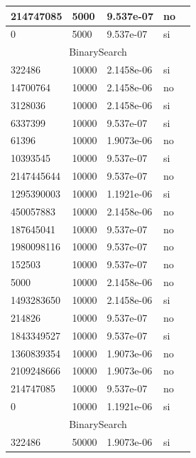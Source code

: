 \documentclass[12pt, fleqn]{article}                             %
\theoremstyle{break}                                            %
\begin{document}
\begin{longtable}{|m{5em}|m{5em}|m{10em}|m{5em}|@{}m{0pt}@{}}
            214747085& 5000  & 9.537e-07 & no &\\[1em]    \hline
            0& 5000  & 9.537e-07 & si &\\[1em]    \hline
            \multicolumn{5}{|c|}{BinarySearch}   \\          \hline
            322486& 10000  & 2.1458e-06 & si &\\[1em]    \hline
            14700764& 10000  & 2.1458e-06 & no &\\[1em]    \hline
            3128036& 10000  & 2.1458e-06 & si &\\[1em]    \hline
            6337399& 10000  & 9.537e-07 & si &\\[1em]    \hline
            61396& 10000  & 1.9073e-06 & no &\\[1em]    \hline
            10393545& 10000  & 9.537e-07 & si &\\[1em]    \hline
            2147445644& 10000  & 9.537e-07 & no &\\[1em]    \hline
            1295390003& 10000  & 1.1921e-06 & si &\\[1em]    \hline
            450057883& 10000  & 2.1458e-06 & no &\\[1em]    \hline
            187645041& 10000  & 9.537e-07 & no &\\[1em]    \hline
            1980098116& 10000  & 9.537e-07 & no &\\[1em]    \hline
            152503& 10000  & 9.537e-07 & no &\\[1em]    \hline
            5000& 10000  & 2.1458e-06 & no &\\[1em]    \hline
            1493283650& 10000  & 2.1458e-06 & si &\\[1em]    \hline
            214826& 10000  & 9.537e-07 & no &\\[1em]    \hline
            1843349527& 10000  & 9.537e-07 & si &\\[1em]    \hline
            1360839354& 10000  & 1.9073e-06 & no &\\[1em]    \hline
            2109248666& 10000  & 1.9073e-06 & no &\\[1em]    \hline
            214747085& 10000  & 9.537e-07 & no &\\[1em]    \hline
            0& 10000  & 1.1921e-06 & si &\\[1em]    \hline
            \multicolumn{5}{|c|}{BinarySearch}   \\          \hline
            322486& 50000  & 1.9073e-06 & si &\\[1em]    \hline

\end{longtable}
\end{document}
